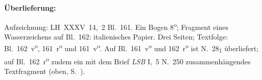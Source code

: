 %
%
%
%
%
\frenchspacing%
%
\begin{ledgroupsized}[r]{120mm}%
\footnotesize%
\pstart%
\noindent\textbf{Überlieferung:}%
\pend%
\end{ledgroupsized}%
\begin{ledgroupsized}[r]{114mm}%
\footnotesize%
\pstart \parindent -6mm
%
Aufzeichnung: LH~XXXV~14,~2 Bl.~161.
Ein Bogen 8\textsuperscript{o};
Fragment eines Wasserzeichens auf Bl.~162:
italienisches Papier.
Drei Seiten;
Textfolge: Bl.~162~v\textsuperscript{o}, 161~r\textsuperscript{o} und 161~v\textsuperscript{o}.
Auf Bl.~161~v\textsuperscript{o}\! und 162~r\textsuperscript{o}\! ist N.~28\textsubscript{1} überliefert;
auf Bl.~162~r\textsuperscript{o} zudem ein mit dem Brief \textit{LSB} I,~5 N.~250\cite{01297} zusammenhängendes Textfragment (oben, S.~).
\pend%
\end{ledgroupsized}%
%
%
%
%
\frenchspacing%
%
\vspace{8mm}%
%
%
\count{}
\count{}
